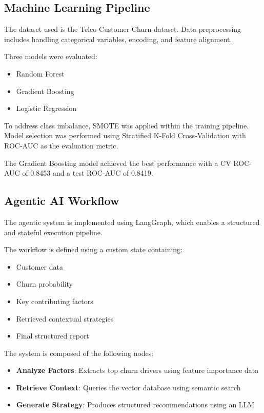 \documentclass[conference]{IEEEtran}
\begin{document}
\subsection{Machine Learning Pipeline}

The dataset used is the Telco Customer Churn dataset. Data preprocessing includes handling categorical variables, encoding, and feature alignment.

Three models were evaluated:
\begin{itemize}[leftmargin=*]
\item Random Forest
\item Gradient Boosting
\item Logistic Regression
\end{itemize}

To address class imbalance, SMOTE was applied within the training pipeline. Model selection was performed using Stratified K-Fold Cross-Validation with ROC-AUC as the evaluation metric.

The Gradient Boosting model achieved the best performance with a CV ROC-AUC of 0.8453 and a test ROC-AUC of 0.8419.

\subsection{Agentic AI Workflow}

The agentic system is implemented using LangGraph, which enables a structured and stateful execution pipeline.

The workflow is defined using a custom state containing:
\begin{itemize}
\item Customer data
\item Churn probability
\item Key contributing factors
\item Retrieved contextual strategies
\item Final structured report
\end{itemize}

The system is composed of the following nodes:

\begin{itemize}
\item \textbf{Analyze Factors}: Extracts top churn drivers using feature importance data
\item \textbf{Retrieve Context}: Queries the vector database using semantic search
\item \textbf{Generate Strategy}: Produces structured recommendations using an LLM
\end{itemize}
\end{document}
